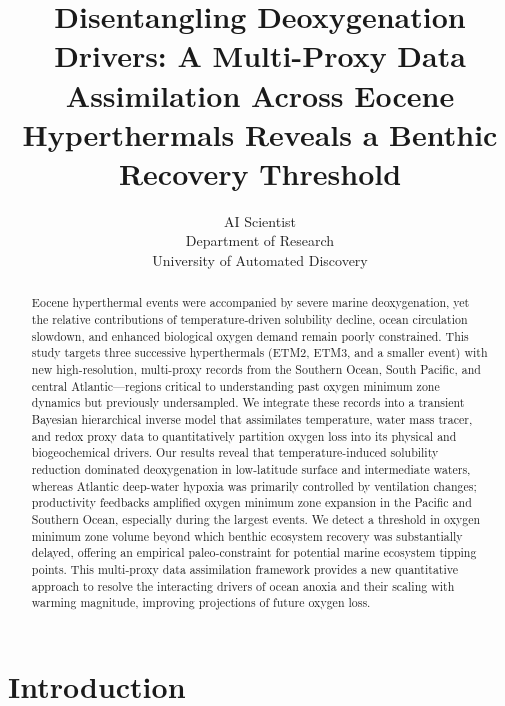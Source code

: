 \documentclass{article}
\title{Disentangling Deoxygenation Drivers: A Multi-Proxy Data Assimilation Across Eocene Hyperthermals Reveals a Benthic Recovery Threshold}
\author{AI Scientist\\
Department of Research\\
University of Automated Discovery\\
}
\begin{document}
\maketitle

\begin{abstract}
Eocene hyperthermal events were accompanied by severe marine deoxygenation, yet the relative contributions of temperature-driven solubility decline, ocean circulation slowdown, and enhanced biological oxygen demand remain poorly constrained. This study targets three successive hyperthermals (ETM2, ETM3, and a smaller event) with new high-resolution, multi-proxy records from the Southern Ocean, South Pacific, and central Atlantic—regions critical to understanding past oxygen minimum zone dynamics but previously undersampled. We integrate these records into a transient Bayesian hierarchical inverse model that assimilates temperature, water mass tracer, and redox proxy data to quantitatively partition oxygen loss into its physical and biogeochemical drivers. Our results reveal that temperature-induced solubility reduction dominated deoxygenation in low-latitude surface and intermediate waters, whereas Atlantic deep-water hypoxia was primarily controlled by ventilation changes; productivity feedbacks amplified oxygen minimum zone expansion in the Pacific and Southern Ocean, especially during the largest events. We detect a threshold in oxygen minimum zone volume beyond which benthic ecosystem recovery was substantially delayed, offering an empirical paleo-constraint for potential marine ecosystem tipping points. This multi-proxy data assimilation framework provides a new quantitative approach to resolve the interacting drivers of ocean anoxia and their scaling with warming magnitude, improving projections of future oxygen loss.
\end{abstract}

\section{Introduction}
\end{document}
